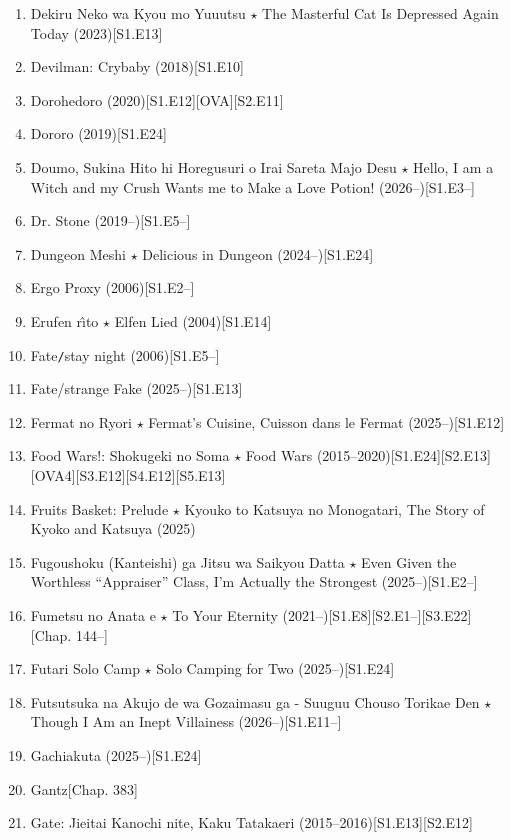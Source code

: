 \documentclass{article}
\begin{document}
\begin{enumerate}
    \item {\sc Dekiru Neko wa Kyou mo Yuuutsu $\star$ The Masterful Cat Is Depressed Again Today} (2023)\hfill[S1.E13]
    \item {\sc Devilman: Crybaby} (2018)\hfill[S1.E10]
    \item {\sc Dorohedoro} (2020)\hfill[S1.E12][OVA][S2.E11]
    \item {\sc Dororo} (2019)\hfill[S1.E24]
    \item Doumo, Sukina Hito hi Horegusuri o Irai Sareta Majo Desu $\star$ Hello, I am a Witch and my Crush Wants me to Make a Love Potion! (2026--)\hfill[S1.E3--]
    \item Dr. Stone (2019--)\hfill[S1.E5--]
    \item {\sc Dungeon Meshi $\star$ Delicious in Dungeon} (2024--)\hfill[S1.E24]
    \item Ergo Proxy (2006)\hfill[S1.E2--]
    \item {\sc Erufen r\^{\i}to $\star$ Elfen Lied} (2004)\hfill[S1.E14]
    \item Fate{\tt/}stay night (2006)\hfill[S1.E5--]
    \item {\sc Fate/strange Fake} (2025--)\hfill[S1.E13]
    \item {\sc Fermat no Ryori $\star$ Fermat's Cuisine, Cuisson dans le Fermat} (2025--)\hfill[S1.E12]
    \item {\sc Food Wars!: Shokugeki no Soma $\star$ Food Wars} (2015--2020)\hfill[S1.E24][S2.E13][OVA4][S3.E12][S4.E12][S5.E13]
    \item {\sc Fruits Basket: Prelude $\star$ Kyouko to Katsuya no Monogatari, The Story of Kyoko and Katsuya} (2025)
    \item Fugoushoku (Kanteishi) ga Jitsu wa Saikyou Datta $\star$ Even Given the Worthless ``Appraiser'' Class, I'm Actually the Strongest (2025--)\hfill[S1.E2--]
    \item Fumetsu no Anata e $\star$ To Your Eternity (2021--)\hfill[S1.E8][S2.E1--][S3.E22][Chap. 144--]
    \item {\sc Futari Solo Camp $\star$ Solo Camping for Two} (2025--)\hfill[S1.E24]
    \item Futsutsuka na Akujo de wa Gozaimasu ga - Suuguu Chouso Torikae Den $\star$ Though I Am an Inept Villainess (2026--)\hfill[S1.E11--]
    \item {\sc Gachiakuta} (2025--)\hfill[S1.E24]
    \item {\sc Gantz}\hfill[Chap. 383]
    \item {\sc Gate: Jieitai Kanochi nite, Kaku Tatakaeri} (2015--2016)\hfill[S1.E13][S2.E12]

\end{enumerate}
\end{document}
